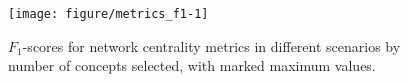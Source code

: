 \begin{knitrout}
\color{fgcolor}\begin{figure}[!htbp]

{\centering \texttt{[image: figure/metrics\_f1-1]} 

}

\caption[$F_1$-scores for network centrality metrics in different scenarios by number of concepts selected, with marked maximum values]{$F_1$-scores for network centrality metrics in different scenarios by number of concepts selected, with marked maximum values.}\label{fig:metrics_f1}
\end{figure}

\end{knitrout}
